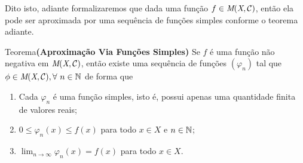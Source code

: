 Dito isto, adiante formalizaremos que dada uma função $f \in \operatorname{\textit{M}(\textit{X}, \mathcal{C} )}$, então ela pode ser aproximada por uma sequência de funções simples conforme o teorema adiante.

\begin{env}{Teorema}\textbf{(Aproximação Via Funções Simples)}
	\label{teo:aproximação via funções simples}
	Se $f$ é uma função não negativa em $\operatorname{\textit{M}(\textit{X}, \mathcal{C} )}$, então existe uma sequência de funções $(\varphi_n)$ tal que $\phi \in \operatorname{\textit{M}(\textit{X}, \mathcal{C} )}, \forall \ n \in \operatorname{\mathbb{N}}$ de forma que
	\begin{enumerate}[label*=(\roman*)]
		\item Cada $\varphi_n$ é uma função simples, isto é, possui apenas uma quantidade finita de valores reais;
		\item $0 \leq \varphi_n(x) \leq f(x)$ para todo $x \in X$ e $n \in \operatorname{\mathbb{N}}$;
		\item $\displaystyle\lim_{n \to \infty} \varphi_n(x) = f(x)$ para todo $x \in X$.
	\end{enumerate}
\end{env} 

